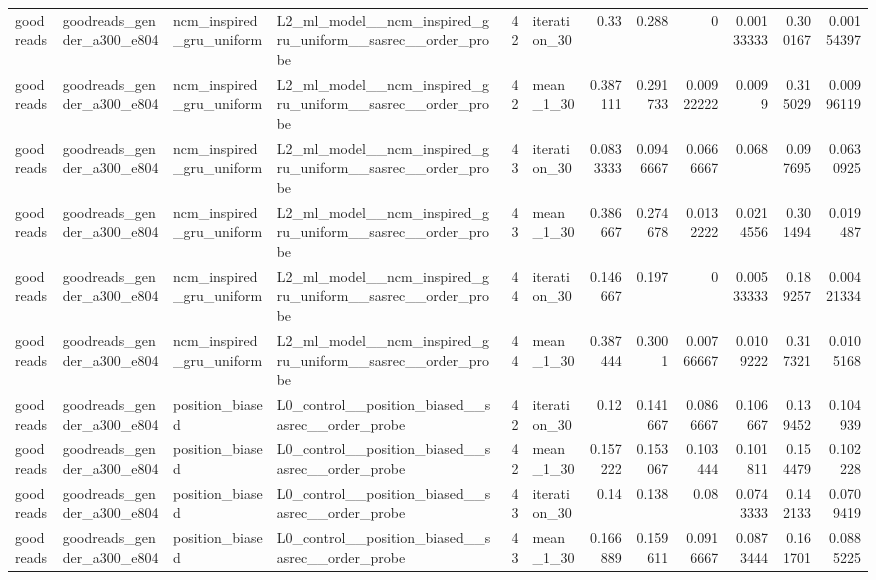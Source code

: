 \begin{table}[htbp!]
\begin{tabular}{llllrlrrrrrr}
goodreads & goodreads\_gender\_a300\_e804 & ncm\_inspired\_gru\_uniform & L2\_ml\_model\_\_ncm\_inspired\_gru\_uniform\_\_sasrec\_\_order\_probe & 42 & iteration\_30 & 0.33 & 0.288 & 0 & 0.00133333 & 0.300167 & 0.00154397 \\
goodreads & goodreads\_gender\_a300\_e804 & ncm\_inspired\_gru\_uniform & L2\_ml\_model\_\_ncm\_inspired\_gru\_uniform\_\_sasrec\_\_order\_probe & 42 & mean\_1\_30 & 0.387111 & 0.291733 & 0.00922222 & 0.0099 & 0.315029 & 0.00996119 \\
goodreads & goodreads\_gender\_a300\_e804 & ncm\_inspired\_gru\_uniform & L2\_ml\_model\_\_ncm\_inspired\_gru\_uniform\_\_sasrec\_\_order\_probe & 43 & iteration\_30 & 0.0833333 & 0.0946667 & 0.0666667 & 0.068 & 0.097695 & 0.0630925 \\
goodreads & goodreads\_gender\_a300\_e804 & ncm\_inspired\_gru\_uniform & L2\_ml\_model\_\_ncm\_inspired\_gru\_uniform\_\_sasrec\_\_order\_probe & 43 & mean\_1\_30 & 0.386667 & 0.274678 & 0.0132222 & 0.0214556 & 0.301494 & 0.019487 \\
goodreads & goodreads\_gender\_a300\_e804 & ncm\_inspired\_gru\_uniform & L2\_ml\_model\_\_ncm\_inspired\_gru\_uniform\_\_sasrec\_\_order\_probe & 44 & iteration\_30 & 0.146667 & 0.197 & 0 & 0.00533333 & 0.189257 & 0.00421334 \\
goodreads & goodreads\_gender\_a300\_e804 & ncm\_inspired\_gru\_uniform & L2\_ml\_model\_\_ncm\_inspired\_gru\_uniform\_\_sasrec\_\_order\_probe & 44 & mean\_1\_30 & 0.387444 & 0.3001 & 0.00766667 & 0.0109222 & 0.317321 & 0.0105168 \\
goodreads & goodreads\_gender\_a300\_e804 & position\_biased & L0\_control\_\_position\_biased\_\_sasrec\_\_order\_probe & 42 & iteration\_30 & 0.12 & 0.141667 & 0.0866667 & 0.106667 & 0.139452 & 0.104939 \\
goodreads & goodreads\_gender\_a300\_e804 & position\_biased & L0\_control\_\_position\_biased\_\_sasrec\_\_order\_probe & 42 & mean\_1\_30 & 0.157222 & 0.153067 & 0.103444 & 0.101811 & 0.154479 & 0.102228 \\
goodreads & goodreads\_gender\_a300\_e804 & position\_biased & L0\_control\_\_position\_biased\_\_sasrec\_\_order\_probe & 43 & iteration\_30 & 0.14 & 0.138 & 0.08 & 0.0743333 & 0.142133 & 0.0709419 \\
goodreads & goodreads\_gender\_a300\_e804 & position\_biased & L0\_control\_\_position\_biased\_\_sasrec\_\_order\_probe & 43 & mean\_1\_30 & 0.166889 & 0.159611 & 0.0916667 & 0.0873444 & 0.161701 & 0.0885225 \\

\end{tabular}
\end{table}
